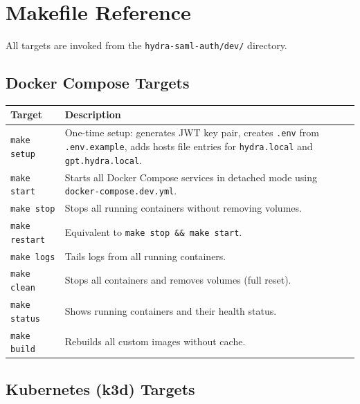 \documentclass[11pt,a4paper]{article}
\newcommand{\cmdref}[1]{\texttt{#1}}
\begin{document}
\section{Makefile Reference}
\label{sec:makefile}

All targets are invoked from the \cmdref{hydra-saml-auth/dev/} directory.

\subsection{Docker Compose Targets}

\begin{center}
\begin{tabularx}{\textwidth}{l X}
    \toprule
    \textbf{Target} & \textbf{Description} \\
    \midrule
    \texttt{make setup} &
        One-time setup: generates JWT key pair, creates \texttt{.env} from
        \texttt{.env.example}, adds hosts file entries for
        \texttt{hydra.local} and \texttt{gpt.hydra.local}. \\
    \addlinespace
    \texttt{make start} &
        Starts all Docker Compose services in detached mode using
        \texttt{docker-compose.dev.yml}. \\
    \addlinespace
    \texttt{make stop} &
        Stops all running containers without removing volumes. \\
    \addlinespace
    \texttt{make restart} &
        Equivalent to \texttt{make stop \&\& make start}. \\
    \addlinespace
    \texttt{make logs} &
        Tails logs from all running containers. \\
    \addlinespace
    \texttt{make clean} &
        Stops all containers and removes volumes (full reset). \\
    \addlinespace
    \texttt{make status} &
        Shows running containers and their health status. \\
    \addlinespace
    \texttt{make build} &
        Rebuilds all custom images without cache. \\
    \bottomrule
\end{tabularx}
\end{center}

\subsection{Kubernetes (k3d) Targets}
\end{document}
